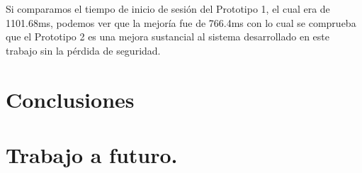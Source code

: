 \documentclass[12pt, a4paper, titlepage]{report}
\begin{document}
	            Si comparamos el tiempo de inicio de sesión del Prototipo 1, el cual era de 1101.68ms, podemos ver que la mejoría fue de 766.4ms con lo cual se comprueba que el Prototipo 2 es una mejora sustancial al sistema desarrollado en este trabajo sin la pérdida de seguridad.
	
	\chapter{\textcolor{azulescom}{Conclusiones}}

		
	\chapter{\textcolor{azulescom}{Trabajo a futuro.}}

	\newpage

	\newpage
\end{document}
